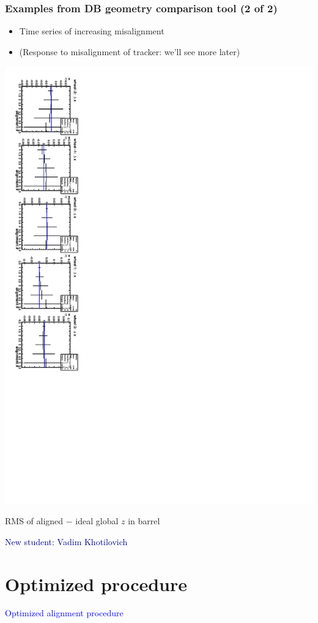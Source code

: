\documentclass[compress]{beamer}
\begin{document}
\begin{frame}
\frametitle{Examples from DB geometry comparison tool (2 of 2)}
\begin{itemize}
\item Time series of increasing misalignment

\item (Response to misalignment of tracker: we'll see more later)
\end{itemize}

\vfill
\begin{center}
\includegraphics[height=\linewidth, angle=90]{c_barrel_dxloc.pdf}

\vspace{0.25 cm}
RMS of aligned $-$ ideal global $z$ in barrel
\end{center}

\vfill
\textcolor{darkblue}{New student: Vadim Khotilovich}
\end{frame}

\section*{Optimized procedure}

\begin{frame}
\begin{center}
\Huge \textcolor{blue}{Optimized alignment procedure}
\end{center}
\end{frame}
\end{document}
